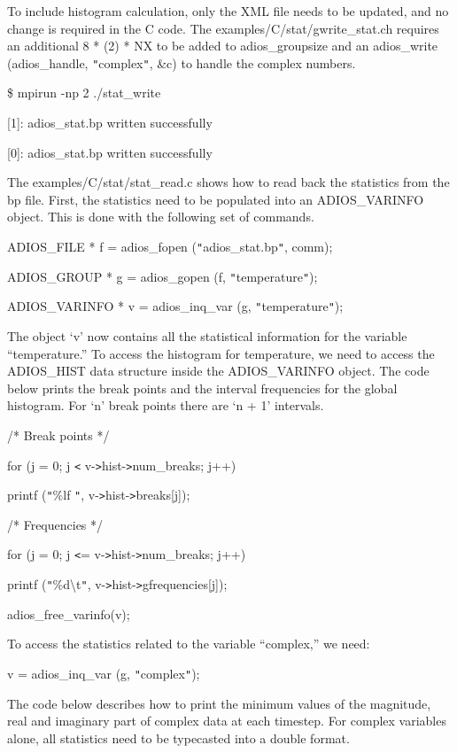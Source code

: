 To include histogram calculation, only the XML file needs to be updated, and no 
change is required in the C code. The examples/C/stat/gwrite\_stat.ch requires 
an additional {\color{color02} 8 * (2) * NX} to be added to adios\_groupsize and 
an adios\_write (adios\_handle, \texttt{"}complex\texttt{"}, \&c) to handle the 
complex numbers.

\$ mpirun -np 2 ./stat\_write

[1]: adios\_stat.bp written successfully

[0]: adios\_stat.bp written successfully

The examples/C/stat/stat\_read.c shows how to read back the statistics from the 
bp file. First, the statistics need to be populated into an ADIOS\_VARINFO object. 
This is done with the following set of commands.

ADIOS\_FILE * f = adios\_fopen (\texttt{"}adios\_stat.bp\texttt{"}, comm);

ADIOS\_GROUP * g = adios\_gopen (f, \texttt{"}temperature\texttt{"});

ADIOS\_VARINFO * v = adios\_inq\_var (g, \texttt{"}temperature\texttt{"});

The object `v' now contains all the statistical information for the variable ``temperature.'' 
To access the histogram for temperature, we need to access the ADIOS\_HIST data 
structure inside the ADIOS\_VARINFO object. The code below prints the break points 
and the interval frequencies for the global histogram. For `n' break points there 
are `n + 1' intervals.

/* Break points */

for (j = 0; j \texttt{<} v-\texttt{>}hist-\texttt{>}num\_breaks; j++)

\parindent=28pt
printf (\texttt{"}\%lf \texttt{"}, v-\texttt{>}hist-\texttt{>}breaks[j]);

\parindent=0pt
/* Frequencies */

for (j = 0; j \texttt{<}= v-\texttt{>}hist-\texttt{>}num\_breaks; j++)

\parindent=28pt
printf (\texttt{"}\%d\textbackslash{}t\texttt{"}, v-\texttt{>}hist-\texttt{>}gfrequencies[j]);

\parindent=0pt
adios\_free\_varinfo(v);

To access the statistics related to the variable ``complex,'' we need:

v = adios\_inq\_var (g, \texttt{"}complex\texttt{"});

The code below describes how to print the minimum values of the magnitude, real 
and imaginary part of complex data at each timestep. For complex variables alone, 
all statistics need to be typecasted into a double format.

